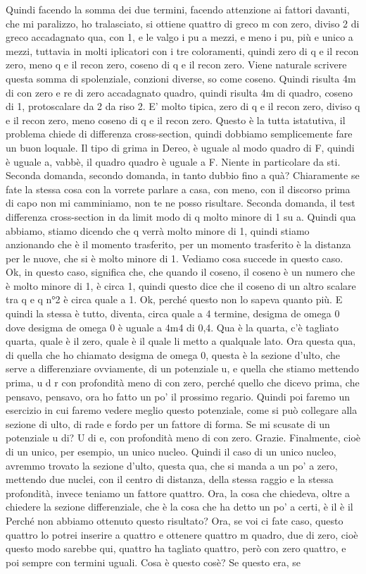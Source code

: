 {\begin{soluzione}
   Quindi facendo la somma dei due termini, facendo attenzione ai fattori davanti, che mi paralizzo, ho tralasciato, si ottiene quattro di greco m con zero, diviso 2 di greco accadagnato qua, con 1, e le valgo i pu a mezzi, e meno i pu, più e unico a mezzi, tuttavia in molti iplicatori con i tre coloramenti, quindi zero di q e il recon zero, meno q e il recon zero, coseno di q e il recon zero. Viene naturale scrivere questa somma di spolenziale, conzioni diverse, so come coseno. Quindi risulta 4m di con zero e re di zero accadagnato quadro, quindi risulta 4m di quadro, coseno di 1, protoscalare da 2 da riso 2. E' molto tipica, zero di q e il recon zero, diviso q e il recon zero, meno coseno di q e il recon zero. Questo è la tutta istatutiva, il problema chiede di differenza cross-section, quindi dobbiamo semplicemente fare un buon loquale. Il tipo di grima in Dereo, è uguale al modo quadro di F, quindi è uguale a, vabbè, il quadro quadro è uguale a F. Niente in particolare da sti. Seconda domanda, secondo domanda, in tanto dubbio fino a quà? Chiaramente se fate la stessa cosa con la vorrete parlare a casa, con meno, con il discorso prima di capo non mi camminiamo, non te ne posso risultare. Seconda domanda, il test differenza cross-section in da limit modo di q molto minore di 1 su a. Quindi qua abbiamo, stiamo dicendo che q verrà molto minore di 1, quindi stiamo anzionando che è il momento trasferito, per un momento trasferito è la distanza per le nuove, che si è molto minore di 1. Vediamo cosa succede in questo caso. Ok, in questo caso, significa che, che quando il coseno, il coseno è un numero che è molto minore di 1, è circa 1, quindi questo dice che il coseno di un altro scalare tra q e q n°2 è circa quale a 1. Ok, perché questo non lo sapeva quanto più. E quindi la stessa è tutto, diventa, circa quale a 4 termine, desigma de omega 0 dove desigma de omega 0 è uguale a 4m4 di 0,4. Qua è la quarta, c'è tagliato quarta, quale è il zero, quale è il quale li metto a qualquale lato. Ora questa qua, di quella che ho chiamato desigma de omega 0, questa è la sezione d'ulto, che serve a differenziare ovviamente, di un potenziale u, e quella che stiamo mettendo prima, u d r con profondità meno di con zero, perché quello che dicevo prima, che pensavo, pensavo, ora ho fatto un po' il prossimo regario. Quindi poi faremo un esercizio in cui faremo vedere meglio questo potenziale, come si può collegare alla sezione di ulto, di rade e fordo per un fattore di forma. Se mi scusate di un potenziale u di? U di e, con profondità meno di con zero. Grazie. Finalmente, cioè di un unico, per esempio, un unico nucleo. Quindi il caso di un unico nucleo, avremmo trovato la sezione d'ulto, questa qua, che si manda a un po' a zero, mettendo due nuclei, con il centro di distanza, della stessa raggio e la stessa profondità, invece teniamo un fattore quattro. Ora, la cosa che chiedeva, oltre a chiedere la sezione differenziale, che è la cosa che ha detto un po' a certi, è il è il Perché non abbiamo ottenuto questo risultato? Ora, se voi ci fate caso, questo quattro lo potrei inserire a quattro e ottenere quattro m quadro, due di zero, cioè questo modo sarebbe qui, quattro ha tagliato quattro, però con zero quattro, e poi sempre con termini uguali. Cosa è questo cosè? Se questo era, se 
\end{soluzione}}
